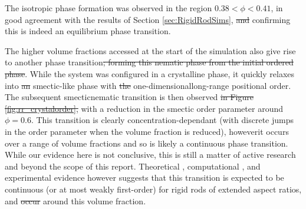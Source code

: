 \documentclass[11pt, a4paper]{article} %
\providecommand{\DIFadd}[1]{{\protect\color{blue}\uwave{#1}}} %
\providecommand{\DIFdel}[1]{{\protect\color{red}\sout{#1}}}                      %
\providecommand{\DIFaddbegin}{} %
\providecommand{\DIFaddend}{} %
\providecommand{\DIFdelbegin}{} %
\providecommand{\DIFdelend}{} %
\begin{document}
The isotropic phase formation was observed in the region $0.38 < \phi< 0.41$, in good agreement with the results of Section \ref{sec:RigidRodSims}, \DIFdelbegin \DIFdel{and }\DIFdelend confirming this is indeed an equilibrium phase transition. \DIFdelbegin %

\DIFdelend The higher volume fractions accessed at the start of the simulation also give rise to another phase transition\DIFdelbegin \DIFdel{; forming this nematic phase from the initial ordered phase}\DIFdelend . While the system was configured in a crystalline phase, it quickly relaxes into \DIFdelbegin \DIFdel{an }\DIFdelend \DIFaddbegin \DIFadd{a }\DIFaddend smectic-like phase with \DIFdelbegin \DIFdel{the }\DIFdelend one-dimensional\DIFaddbegin \DIFadd{, }\DIFaddend long-range positional order. The subsequent smectic\textendash nematic transition is then observed \DIFdelbegin \DIFdel{in Figure \ref{fig:rr_crystalorder}, }\DIFdelend with a reduction in the smectic order parameter around $\phi  = 0.6$\DIFaddbegin \DIFadd{, \textcolor{forestgreen}{as shown} in Figure \ref{fig:rr_crystalorder}}\DIFaddend . This transition is clearly concentration-dependant (with discrete jumps in the order parameter when the volume fraction is reduced), however\DIFaddbegin \DIFadd{, }\DIFaddend it occurs over a range of volume fractions and so is likely a continuous phase transition. While our evidence here is not conclusive, this is still a matter of active research and beyond the scope of this report. Theoretical \cite{Wen1987}, computational \cite{Frenkel1988, McGrother1996}, and experimental \cite{Dogic1997, Doane1972} evidence however suggests that this transition is expected to be continuous (or at most weakly first-order) for rigid rods of extended aspect ratios, and \DIFdelbegin \DIFdel{occur }\DIFdelend \DIFaddbegin \DIFadd{occurs }\DIFaddend around this volume fraction. 
\end{document}
